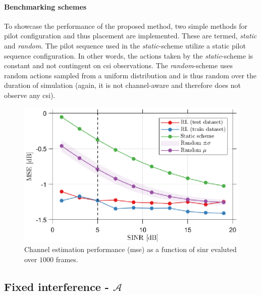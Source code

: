 \paragraph{Benchmarking schemes}
To showcase the performance of the proposed method, two simple methods for pilot configuration and thus placement are implemented. These are termed, \emph{static} and \emph{random}. The pilot sequence used in the \emph{static}-scheme utilize a static pilot sequence configuration. In other words, the actions taken by the \emph{static}-scheme is constant and not contingent on \gls{csi} observations. The \emph{random}-scheme uses random actions sampled from a uniform distribution and is thus random over the duration of simulation (again, it is not channel-aware and therefore does not observe any \gls{csi}). 
 \begin{figure}
    \centering
    \includegraphics{chapters/part_uplink/figures/results/SINR_sweep.eps}
    \caption{Channel estimation performance (\gls{mse}) as a function of \gls{sinr} evaluted over $1000$ frames.}
    \label{fig:RL_sinr_sweep}
\end{figure}

\subsection{Fixed interference -  $\mathcal{A}$}\label{subsec:RL_results_A}

